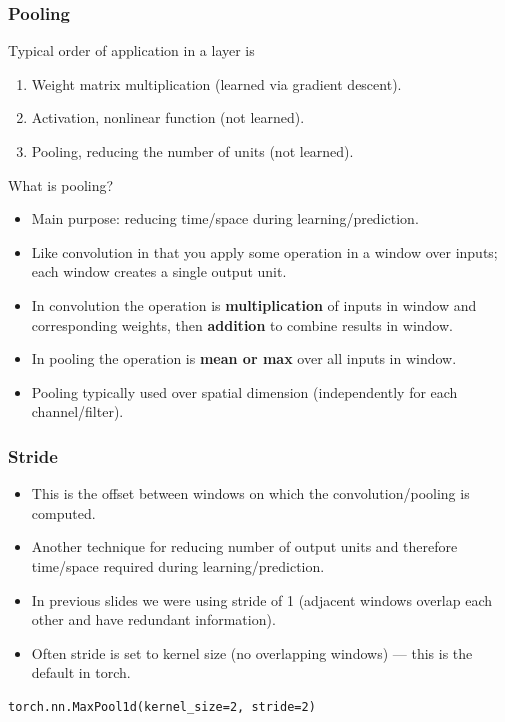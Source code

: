 \documentclass{beamer}
\begin{document}
\begin{frame}
  \frametitle{Pooling}
  Typical order of application in a layer is
  \begin{enumerate}
  \item Weight matrix multiplication (learned via gradient descent).
  \item Activation, nonlinear function (not learned).
  \item Pooling, reducing the number of units (not learned).
  \end{enumerate}
  What is pooling? 
  \begin{itemize}
  \item Main purpose: reducing time/space during learning/prediction.
  \item Like convolution in that you apply some operation in a window
    over inputs; each window creates a single output unit.
  \item In convolution the operation is \textbf{multiplication} of inputs in
    window and corresponding weights, then \textbf{addition} to combine results
    in window.
  \item In pooling the operation is \textbf{mean or max} over all inputs in
    window.
  \item Pooling typically used over spatial dimension (independently
    for each channel/filter). 
  \end{itemize}
\end{frame}

\begin{frame}[fragile]
  \frametitle{Stride}
  \begin{itemize}
  \item This is the offset between windows on which the
    convolution/pooling is computed.
  \item Another technique for reducing number of output units and
    therefore time/space required during learning/prediction.
  \item In previous slides we were using stride of 1 (adjacent windows
    overlap each other and have redundant information).
  \item Often stride is set to kernel size (no overlapping windows)
    --- this is the default in torch.
  \end{itemize} 
\begin{verbatim}
torch.nn.MaxPool1d(kernel_size=2, stride=2)
\end{verbatim}
\end{frame}
\end{document}

